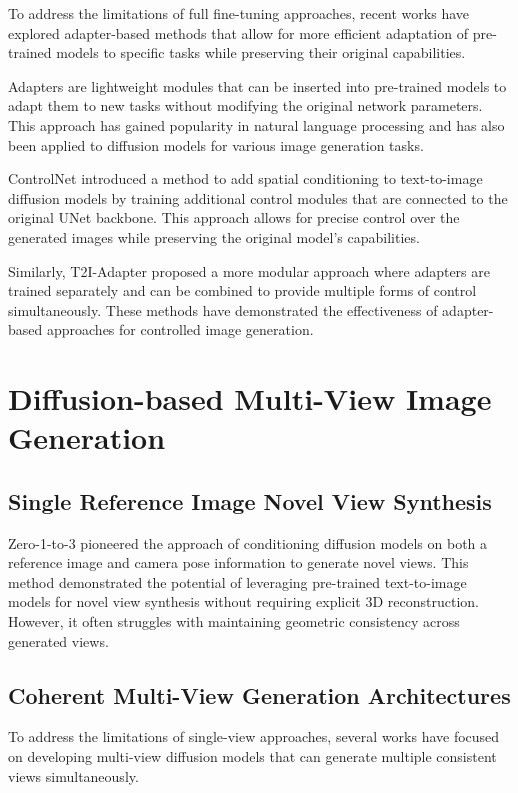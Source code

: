 To address the limitations of full fine-tuning approaches, recent
works have explored adapter-based methods that allow for more
efficient adaptation of pre-trained models to specific tasks while
preserving their original capabilities.

Adapters are lightweight modules that can be inserted into
pre-trained models to adapt them to new tasks without modifying the
original network parameters. This approach has gained popularity in
natural language processing and has also been applied to diffusion
models for various image generation tasks.

ControlNet \cite{controlnet} introduced a method to add spatial
conditioning to text-to-image diffusion models by training additional
control modules that are connected to the original UNet backbone.
This approach allows for precise control over the generated images
while preserving the original model's capabilities.

Similarly, T2I-Adapter \cite{t2iadapter} proposed a more modular
approach where adapters are trained separately and can be combined to
provide multiple forms of control simultaneously. These methods have
demonstrated the effectiveness of adapter-based approaches for
controlled image generation.

\section{Diffusion-based Multi-View Image
Generation}\label{sec:multi-view-diffusion}

\subsection{Single Reference Image Novel View Synthesis}

Zero-1-to-3 \cite{zero1to3} pioneered the approach of conditioning
diffusion models on both a reference image and camera pose
information to generate novel views. This method demonstrated the
potential of leveraging pre-trained text-to-image models for novel
view synthesis without requiring explicit 3D reconstruction. However,
it often struggles with maintaining geometric consistency across
generated views.

\subsection{Coherent Multi-View Generation Architectures}

To address the limitations of single-view approaches, several works
have focused on developing multi-view diffusion models that can
generate multiple consistent views simultaneously.

